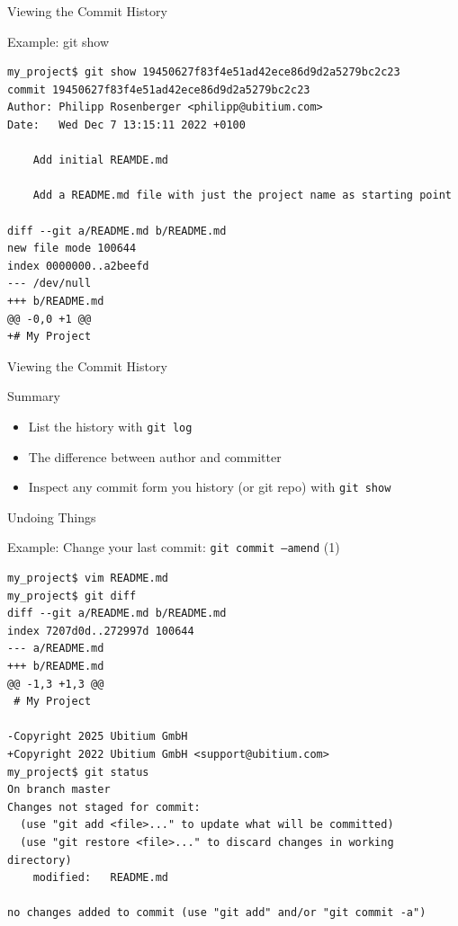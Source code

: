 \documentclass[aspectratio=169]{beamer}
\renewcommand{\footnotesize}{\tiny}
\newcommand{\sectiontitle}{}
\begin{document}
\begin{frame}[fragile]{Viewing the Commit History}{\sectiontitle}
\begin{block}{Example: \ttfamily git show}
\begin{verbatim}
my_project$ git show 19450627f83f4e51ad42ece86d9d2a5279bc2c23
commit 19450627f83f4e51ad42ece86d9d2a5279bc2c23
Author: Philipp Rosenberger <philipp@ubitium.com>
Date:   Wed Dec 7 13:15:11 2022 +0100

    Add initial REAMDE.md

    Add a README.md file with just the project name as starting point

diff --git a/README.md b/README.md
new file mode 100644
index 0000000..a2beefd
--- /dev/null
+++ b/README.md
@@ -0,0 +1 @@
+# My Project
\end{verbatim}
\end{block}
\end{frame}

\begin{frame}[fragile]{Viewing the Commit History}{\sectiontitle}
\begin{block}{Summary}
\begin{itemize}
    \item List the history with \verb|git log|
    \item The difference between author and committer
    \item Inspect any commit form you history (or git repo) with \verb|git show|
\end{itemize}
\end{block}
\end{frame}

\begin{frame}[fragile]{Undoing Things}{\sectiontitle}
\begin{block}{Example: Change your last commit: \texttt{git commit --amend} {\small(1)}}
\begin{verbatim}
my_project$ vim README.md
my_project$ git diff
diff --git a/README.md b/README.md
index 7207d0d..272997d 100644
--- a/README.md
+++ b/README.md
@@ -1,3 +1,3 @@
 # My Project

-Copyright 2025 Ubitium GmbH
+Copyright 2022 Ubitium GmbH <support@ubitium.com>
my_project$ git status
On branch master
Changes not staged for commit:
  (use "git add <file>..." to update what will be committed)
  (use "git restore <file>..." to discard changes in working directory)
    modified:   README.md

no changes added to commit (use "git add" and/or "git commit -a")
\end{verbatim}
\end{block}
\end{frame}
\end{document}
